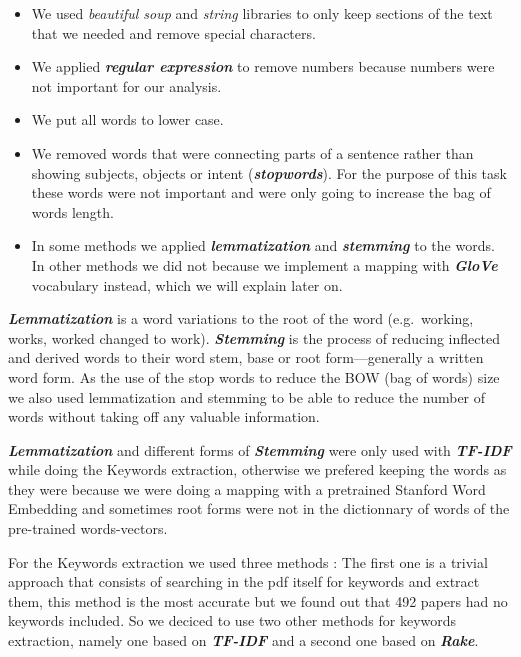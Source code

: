 \documentclass[article,twocolumn]{IEEEtran}
\begin{document}
\begin{itemize}
\item
  We used \emph{beautiful soup} and \emph{string} libraries to only keep
  sections of the text that we needed and remove special characters.
\item
  We applied \textbf{\emph{regular expression}} to remove numbers
  because numbers were not important for our analysis.
\item
  We put all words to lower case.
\item
  We removed words that were connecting parts of a sentence rather than
  showing subjects, objects or intent (\textbf{\emph{stopwords}}). For
  the purpose of this task these words were not important and were only
  going to increase the bag of words length.
\item
  In some methods we applied \textbf{\emph{lemmatization}} and
  \textbf{\emph{stemming}} to the words. In other methods we did not
  because we implement a mapping with \textbf{\emph{GloVe}} vocabulary
  instead, which we will explain later on.
\end{itemize}

\textbf{\emph{Lemmatization}} is a word variations to the root of the
word (e.g.~working, works, worked changed to work).
\textbf{\emph{Stemming}} is the process of reducing inflected and
derived words to their word stem, base or root form---generally a
written word form. As the use of the stop words to reduce the BOW (bag
of words) size we also used lemmatization and stemming to be able to
reduce the number of words without taking off any valuable information.

\textbf{\emph{Lemmatization}} and different forms of
\textbf{\emph{Stemming}} were only used with \textbf{\emph{TF-IDF}}
while doing the Keywords extraction, otherwise we prefered keeping the
words as they were because we were doing a mapping with a pretrained
Stanford Word Embedding \cite{GloVe_web} and sometimes root forms were
not in the dictionnary of words of the pre-trained words-vectors.

For the Keywords extraction we used three methods : The first one is a
trivial approach that consists of searching in the pdf itself for
keywords and extract them, this method is the most accurate but we found
out that 492 papers had no keywords included. So we deciced to use two
other methods for keywords extraction, namely one based on
\textbf{\emph{TF-IDF}} and a second one based on \textbf{\emph{Rake}}.
\end{document}
